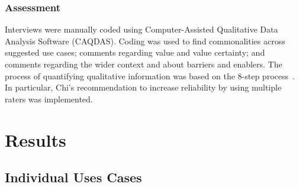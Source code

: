 \documentclass[b5paper,10pt]{article}
\begin{document}
\subsubsection{Assessment}

Interviews were manually coded using Computer-Assisted Qualitative
Data Analysis Software (CAQDAS). Coding was used to find commonalities
across suggested use cases; comments regarding value and value
certainty; and comments regarding the wider context and about barriers
and enablers. The process of quantifying qualitative information was
based on the 8-step process~\citep{chi:1997}. In particular, Chi's
recommendation to increase reliability by using multiple raters was
implemented.

\section{Results}





\subsection{Individual Uses Cases}
\end{document}
